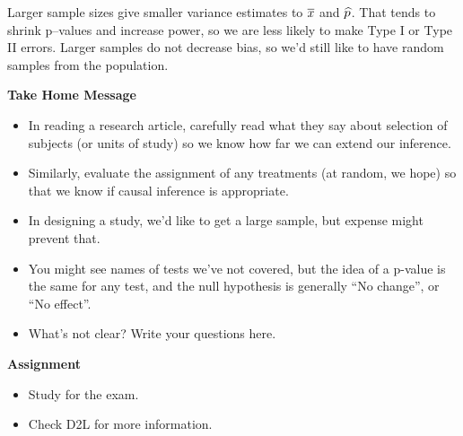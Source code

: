 \begin{enumerate}
\begin{students}
 \vspace{4cm}
\end{students}

\begin{key}
   Larger sample sizes give smaller variance estimates to $\overline{x}$ and
   $\widehat{p}$.  That tends to shrink p--values and increase power, so we
   are less likely to make Type I or Type II errors. Larger samples do
   not decrease bias, so we'd still like to have random samples from
   the population.
\end{key}


\end{enumerate}


\begin{center}
  {\large\bf Take Home Message}
\end{center}

\begin{itemize}
\item  In reading a research article, carefully read what they say
  about selection of subjects (or units of study) so we know how far
  we can extend our inference.
\item Similarly, evaluate the assignment of any treatments (at random,
  we hope) so that we know if causal inference is appropriate.
\item In designing a study, we'd like to get a large sample, but
  expense might prevent that.
\item You might see names of tests we've not covered, but the idea of
  a p-value is the same for any test, and the null hypothesis is
  generally ``No change'', or ``No effect''.
\item What's not clear?  Write your questions here.
  \vfill
\end{itemize}


\begin{center}
  {\large\bf Assignment}
\end{center}

\begin{itemize}
\item Study for the exam.
\item Check D2L for more information.
\end{itemize}


